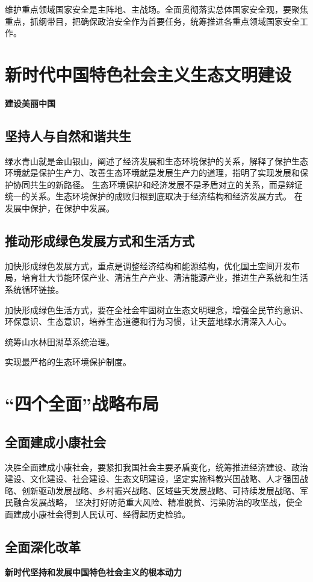 \documentclass[a4paper, UTF8]{ctexart}
\begin{document}
    维护重点领域国家安全是主阵地、主战场。全面贯彻落实总体国家安全观，要聚焦重点，抓纲带目，把确保政治安全作为首要任务，统筹推进各重点领域国家安全工作。

\section{新时代中国特色社会主义生态文明建设}
    \textbf{建设美丽中国}

    \subsection{坚持人与自然和谐共生}
    绿水青山就是金山银山，阐述了经济发展和生态环境保护的关系，解释了保护生态环境就是保护生产力、改善生态环境就是发展生产力的道理，指明了实现发展和保护协同共生的新路径。
    生态环境保护和经济发展不是矛盾对立的关系，而是辩证统一的关系。生态环境保护的成败归根到底取决于经济结构和经济发展方式。
    在发展中保护，在保护中发展。

    \subsection{推动形成绿色发展方式和生活方式}
    加快形成绿色发展方式，重点是调整经济结构和能源结构，优化国土空间开发布局，培育壮大节能环保产业、清洁生产产业、清洁能源产业，推进生产系统和生活系统循环链接。

    加快形成绿色生活方式，要在全社会牢固树立生态文明理念，增强全民节约意识、环保意识、生态意识，培养生态道德和行为习惯，让天蓝地绿水清深入人心。

    统筹山水林田湖草系统治理。

    实现最严格的生态环境保护制度。

\section{“四个全面”战略布局}
    \subsection{全面建成小康社会}
    决胜全面建成小康社会，要紧扣我国社会主要矛盾变化，统筹推进经济建设、政治建设、文化建设、社会建设、生态文明建设，坚定实施科教兴国战略、人才强国战略、创新驱动发展战略、乡村振兴战略、区域些天发展战略、可持续发展战略、军民融合发展战略，
    坚决打好防范重大风险、精准脱贫、污染防治的攻坚战，使全面建成小康社会得到人民认可、经得起历史检验。

    \subsection{全面深化改革}
    \textbf{新时代坚持和发展中国特色社会主义的根本动力}
\end{document}
